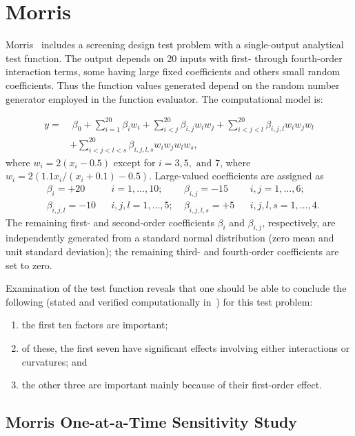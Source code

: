 \clearpage
\section{Morris}\label{additional:morris}

Morris~\cite{Mor91} includes a screening design test problem with a
single-output analytical test function. The output depends on 20
inputs with first- through fourth-order interaction terms, some having
large fixed coefficients and others small random coefficients. Thus
the function values generated depend on the random number generator
employed in the function evaluator. The computational model is:

\begin{align*}
y = &\;\beta_0 + \sum_{i=1}^{20}{\beta_i w_i} + \sum_{i<j}^{20}{\beta_{i,j} w_i w_j} + \sum_{i<j<l}^{20}{\beta_{i,j,l} w_i w_j w_l} \\
    &+  \sum_{i<j<l<s}^{20}{\beta_{i,j,l,s} w_i w_j w_l w_s},
\end{align*}
where $w_i = 2(x_i-0.5)$ except for $i=3, 5, \mbox{ and } 7$, where $w_i=2(1.1x_i/(x_i+0.1) - 0.5)$. Large-valued coefficients are assigned as 
\begin{align*}
&\beta_i = +20 & &i=1,\ldots,10; \;&\beta_{i,j} = -15& &i,j = 1, \ldots, 6; \\
&\beta_{i,j,l} = -10& &i,j,l=1,\ldots,5; \;&\beta_{i,j,l,s} = +5& &i,j,l,s = 1, \ldots, 4.
\end{align*}
The remaining first- and second-order coefficients $\beta_i$ and
$\beta_{i,j}$, respectively, are independently generated from a
standard normal distribution (zero mean and unit standard deviation);
the remaining third- and fourth-order coefficients are set to zero.

Examination of the test function reveals that one should be able to
conclude the following (stated and verified computationally
in~\cite{Sal04}) for this test problem:
\begin{enumerate}
\item the first ten factors are important;
\item of these, the first seven have significant effects involving
      either interactions or curvatures; and
\item the other three are important mainly because of their first-order
      effect.
\end{enumerate}

\subsection{Morris One-at-a-Time Sensitivity Study}

